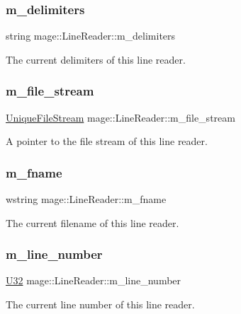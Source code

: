 \subsubsection{\texorpdfstring{m\+\_\+delimiters}{m\_delimiters}}
{\footnotesize\ttfamily string mage\+::\+Line\+Reader\+::m\+\_\+delimiters\hspace{0.3cm}{\ttfamily [private]}}

The current delimiters of this line reader. \hypertarget{classmage_1_1_line_reader_a510ff5355c6d26d7c29dc692ef18a3e2}{}\label{classmage_1_1_line_reader_a510ff5355c6d26d7c29dc692ef18a3e2} 
\subsubsection{\texorpdfstring{m\+\_\+file\+\_\+stream}{m\_file\_stream}}
{\footnotesize\ttfamily \hyperlink{namespacemage_a0ee1bd45ad7dbb3dc8c8e1770e3538d4}{Unique\+File\+Stream} mage\+::\+Line\+Reader\+::m\+\_\+file\+\_\+stream\hspace{0.3cm}{\ttfamily [private]}}

A pointer to the file stream of this line reader. \hypertarget{classmage_1_1_line_reader_ad6f55ba12fc610ab2fc1c26a48d12321}{}\label{classmage_1_1_line_reader_ad6f55ba12fc610ab2fc1c26a48d12321} 
\subsubsection{\texorpdfstring{m\+\_\+fname}{m\_fname}}
{\footnotesize\ttfamily wstring mage\+::\+Line\+Reader\+::m\+\_\+fname\hspace{0.3cm}{\ttfamily [private]}}

The current filename of this line reader. \hypertarget{classmage_1_1_line_reader_ab145590a7e115106c0987905fde98393}{}\label{classmage_1_1_line_reader_ab145590a7e115106c0987905fde98393} 
\subsubsection{\texorpdfstring{m\+\_\+line\+\_\+number}{m\_line\_number}}
{\footnotesize\ttfamily \hyperlink{namespacemage_a41c104c036fba3756a74e19f793eeaa1}{U32} mage\+::\+Line\+Reader\+::m\+\_\+line\+\_\+number\hspace{0.3cm}{\ttfamily [private]}}

The current line number of this line reader. 